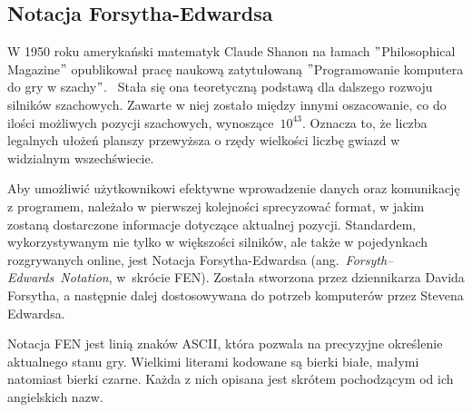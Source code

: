 \subsection{Notacja Forsytha-Edwardsa}
\label{subsec:notacja-fen}


W 1950 roku amerykański matematyk Claude Shanon na łamach \("\)Philosophical Magazine\("\) opublikował pracę naukową zatytułowaną \("\)Programowanie komputera do gry w szachy\("\).~\cite*{Shannon1950XXIIPA}
Stała się ona teoretyczną podstawą dla dalszego rozwoju silników szachowych.
Zawarte w niej zostało między innymi oszacowanie, co do ilości możliwych pozycji szachowych, wynoszące~$10^{43}$.
Oznacza to, że liczba legalnych ułożeń planszy przewyższa o rzędy wielkości liczbę gwiazd w widzialnym wszechświecie.

Aby umożliwić użytkownikowi efektywne wprowadzenie danych oraz komunikację z programem, należało w pierwszej kolejności sprecyzować format, w jakim zostaną dostarczone informacje dotyczące aktualnej pozycji.
Standardem, wykorzystywanym nie tylko w większości silników, ale także w pojedynkach rozgrywanych online, jest Notacja Forsytha-Edwardsa (ang.~\emph{Forsyth–Edwards~Notation}, w~skrócie FEN).
Została stworzona przez dziennikarza Davida Forsytha, a następnie dalej dostosowywana do potrzeb komputerów przez Stevena Edwardsa.

Notacja FEN jest linią znaków ASCII, która pozwala na precyzyjne określenie aktualnego stanu gry.
Wielkimi literami kodowane są bierki białe, małymi natomiast bierki czarne.
Każda z nich opisana jest skrótem pochodzącym od ich angielskich nazw.

